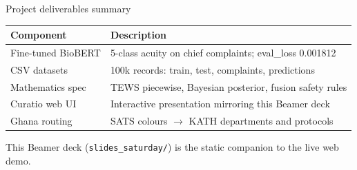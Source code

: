 \begin{frame}{Project deliverables summary}
  \footnotesize
  \begin{tabular}{@{}p{3.2cm}p{8.5cm}@{}}
    \toprule
    \textbf{Component} & \textbf{Description} \\
    \midrule
    Fine-tuned BioBERT & 5-class acuity on chief complaints; eval\_loss 0.001812 \\
    CSV datasets & 100k records: train, test, complaints, predictions \\
    Mathematics spec & TEWS piecewise, Bayesian posterior, fusion safety rules \\
    Curatio web UI & Interactive presentation mirroring this Beamer deck \\
    Ghana routing & SATS colours $\to$ KATH departments and protocols \\
    \bottomrule
  \end{tabular}

  \vspace{0.5em}
  \normalsize
  This Beamer deck (\texttt{slides\_saturday/}) is the static companion to the live web demo.
\end{frame}
